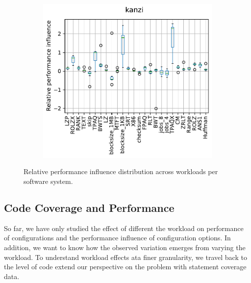\begin{figure}
\begin{minipage}{0.33\textwidth}
\begin{subfigure}{\linewidth}
		\end{subfigure}
	\end{minipage}
	\begin{minipage}{0.33\textwidth}
		\begin{subfigure}{\linewidth}
			\includegraphics[width=\linewidth]{images/rq2/relative_performance_kanzi.pdf}
			\vspace{1.19cm}
		\end{subfigure}
	\end{minipage}
	\caption{Relative performance influence distribution across workloads per software system.}
	\label{fig:feature_influence_actross_workloads}
\end{figure}

\vspace{1em}


\subsection{Code Coverage and Performance}\label{sec:rq3}
So far, we have only studied the effect of different the workload on performance of configurations and the performance influence of configuration options. In addition, we want to know how the observed variation emerges from  varying the workload. To understand workload effects ata finer granularity, we travel back to the level of code extend our perspective on the problem with statement coverage data. 

